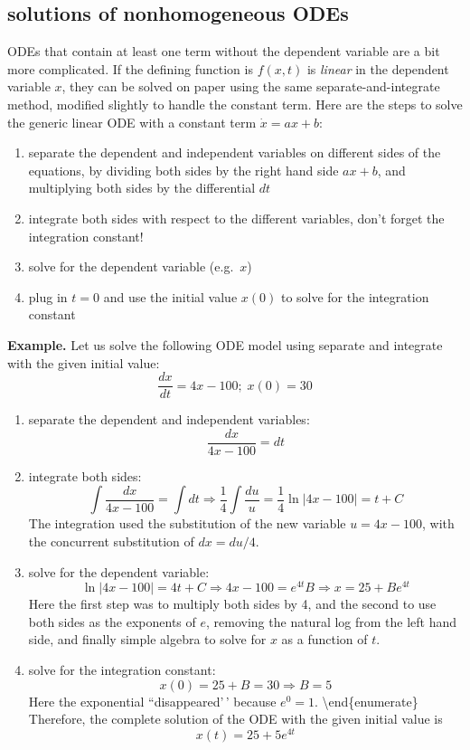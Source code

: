 \documentclass[
]{book}
\providecommand{\tightlist}{%
  \setlength{\itemsep}{0pt}\setlength{\parskip}{0pt}}
\theoremstyle{definition}
\theoremstyle{definition}
\theoremstyle{definition}
\theoremstyle{remark}
\begin{document}
\hypertarget{solutions-of-nonhomogeneous-odes}{%
\subsection{solutions of nonhomogeneous ODEs}\label{solutions-of-nonhomogeneous-odes}}

ODEs that contain at least one term without the dependent variable are a bit more complicated. If the defining function is \(f(x,t)\) is \emph{linear} in the dependent variable \(x\), they can be solved on paper using the same separate-and-integrate method, modified slightly to handle the constant term. Here are the steps to solve the generic linear ODE with a constant term \(\dot x = ax +b\):

\begin{enumerate}
\def\labelenumi{\arabic{enumi}.}
\tightlist
\item
  separate the dependent and independent variables on different sides of the equations, by dividing both sides by the right hand side \(ax+b\), and multiplying both sides by the differential \(dt\)
\item
  integrate both sides with respect to the different variables, don't forget the integration constant!
\item
  solve for the dependent variable (e.g.~\(x\))
\item
  plug in \(t=0\) and use the initial value \(x(0)\) to solve for the integration constant
\end{enumerate}

\textbf{Example.} Let us solve the following ODE model using separate and integrate with the given initial value:
\[\frac{dx}{dt} = 4x -100;  \; x(0) = 30\]

\begin{enumerate}
\def\labelenumi{\arabic{enumi}.}
\item
  separate the dependent and independent variables:
  \[ \frac{dx}{4x - 100} = dt\]
\item
  integrate both sides:
  \[  \int \frac{dx}{4x -100} =  \int dt \Rightarrow \frac{1}{4} \int \frac{du}{u} = \frac{1}{4} \ln | 4x- 100 |  = t + C\]
  The integration used the substitution of the new variable \(u=4x -100\), with the concurrent substitution of \(dx = du/4\).
\item
  solve for the dependent variable:
  \[  \ln | 4x- 100 |  = 4t + C \Rightarrow 4x-100 = e^{4t} B  \Rightarrow x = 25  + Be^{4t}\]
  Here the first step was to multiply both sides by 4, and the second to use both sides as the exponents of \(e\), removing the natural log from the left hand side, and finally simple algebra to solve for \(x\) as a function of \(t\).
\item
  solve for the integration constant:
  \[ x(0) = 25  + B = 30 \Rightarrow B = 5\]
  Here the exponential ``disappeared'\,' because \(e^0=1\).
  \textbackslash end\{enumerate\}
  Therefore, the complete solution of the ODE with the given initial value is
  \[x(t) =  25  + 5e^{4t}\]
\end{enumerate}
\end{document}
